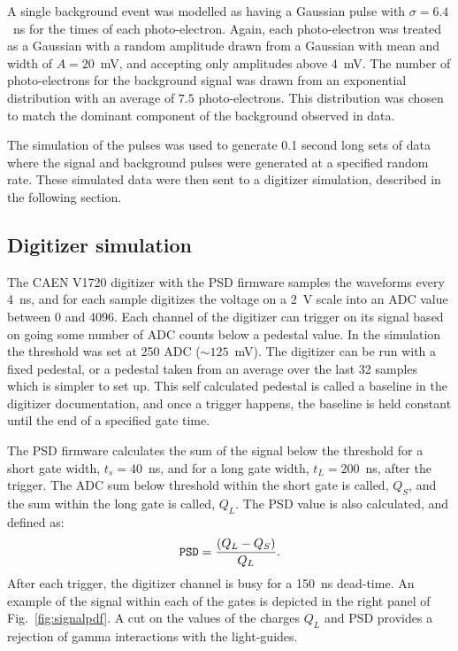 \documentclass[twocolumn]{bmcart}
\begin{document}
A single background event was modelled as having a Gaussian pulse with
$\sigma=6.4$~ns for the times of each photo-electron.  Again, each
photo-electron was treated as a Gaussian with a random amplitude drawn
from a Gaussian with mean and width of $A=20$~mV, and accepting only
amplitudes above 4~mV.  The number of photo-electrons for the
background signal was drawn from an exponential distribution with an
average of $7.5$ photo-electrons.  This distribution was chosen to match
the dominant component of the background observed in data.

The simulation of the pulses was used to generate 0.1 second long sets
of data where the signal and background pulses were generated at a
specified random rate.  These simulated data were then sent to a
digitizer simulation, described in the following section.


\subsection{ Digitizer simulation }\label{sec:digisim}
 
The CAEN V1720 digitizer with the PSD firmware samples the waveforms
every 4~ns, and for each sample digitizes the voltage on a $2$~V
scale into an ADC value between 0 and 4096.  Each channel of the
digitizer can trigger on its signal based on going some number of ADC
counts below a pedestal value.  In the simulation the threshold was
set at 250 ADC ($\sim 125$~mV).  The digitizer can be run with a fixed
pedestal, or a pedestal taken from an average over the last 32 samples
which is simpler to set up.  This self calculated pedestal is called a
baseline in the digitizer documentation, and once a trigger happens,
the baseline is held constant until the end of a specified gate time.

The PSD firmware calculates the sum of the signal below the threshold
for a short gate width, $t_s=40$~ns, and for a long gate width,
$t_L=200$~ns, after the trigger.  The ADC sum below threshold within
the short gate is called, $Q_S$, and the sum within the long gate is
called, $Q_L$.  The PSD value is also calculated, and defined as:
\begin{equation}
{\tt PSD} = \frac{ (Q_L - Q_S)} { Q_L }.
\end{equation}
After each trigger, the digitizer channel is busy for a 150~ns
dead-time.  An example of the signal within each of the gates is
depicted in the right panel of Fig.~\ref{fig:signalpdf}.  A cut on the
values of the charges $Q_L$ and PSD provides a rejection of gamma
interactions with the light-guides.
\end{document}
